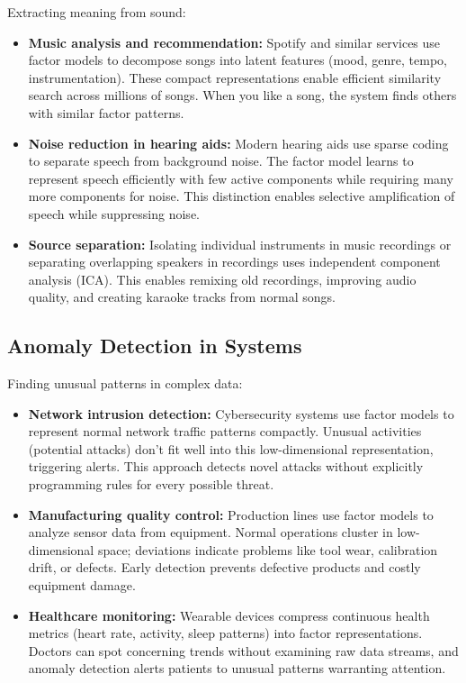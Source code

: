 Extracting meaning from sound:

\begin{itemize}
    \item \textbf{Music analysis and recommendation:} Spotify and similar services use factor models to decompose songs into latent features (mood, genre, tempo, instrumentation). These compact representations enable efficient similarity search across millions of songs. When you like a song, the system finds others with similar factor patterns.
    
    \item \textbf{Noise reduction in hearing aids:} Modern hearing aids use sparse coding to separate speech from background noise. The factor model learns to represent speech efficiently with few active components while requiring many more components for noise. This distinction enables selective amplification of speech while suppressing noise.
    
    \item \textbf{Source separation:} Isolating individual instruments in music recordings or separating overlapping speakers in recordings uses independent component analysis (ICA). This enables remixing old recordings, improving audio quality, and creating karaoke tracks from normal songs.
\end{itemize}

\subsection{Anomaly Detection in Systems}

Finding unusual patterns in complex data:

\begin{itemize}
    \item \textbf{Network intrusion detection:} Cybersecurity systems use factor models to represent normal network traffic patterns compactly. Unusual activities (potential attacks) don't fit well into this low-dimensional representation, triggering alerts. This approach detects novel attacks without explicitly programming rules for every possible threat.
    
    \item \textbf{Manufacturing quality control:} Production lines use factor models to analyze sensor data from equipment. Normal operations cluster in low-dimensional space; deviations indicate problems like tool wear, calibration drift, or defects. Early detection prevents defective products and costly equipment damage.
    
    \item \textbf{Healthcare monitoring:} Wearable devices compress continuous health metrics (heart rate, activity, sleep patterns) into factor representations. Doctors can spot concerning trends without examining raw data streams, and anomaly detection alerts patients to unusual patterns warranting attention.
\end{itemize}

